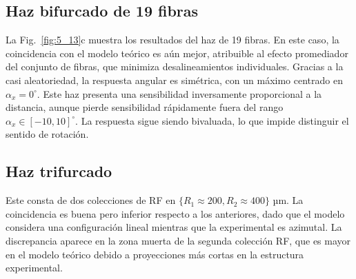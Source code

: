 \documentclass[11pt,a4paper]{article}
\begin{document}
\begin{multicols}{2}
\subsection{Haz bifurcado de 19 fibras}
La Fig.~\ref{fig:5_13}c muestra los resultados del haz de 19 fibras. En este caso, la coincidencia con el modelo teórico es aún mejor, atribuible al efecto promediador del conjunto de fibras, que minimiza desalineamientos individuales. Gracias a la casi aleatoriedad, la respuesta angular es simétrica, con un máximo centrado en $\alpha_x=0^\circ$. Este haz presenta una sensibilidad inversamente proporcional a la distancia, aunque pierde sensibilidad rápidamente fuera del rango $\alpha_x \in [-10,10]^\circ$. La respuesta sigue siendo bivaluada, lo que impide distinguir el sentido de rotación.
\unskip
\subsection{Haz trifurcado}
\unskip
Este consta de dos colecciones de RF en $\lbrace R_1 \approx 200,R_2 \approx 400\rbrace$ µm. La coincidencia es buena pero inferior respecto a los anteriores, dado que el modelo considera una configuración lineal mientras que la experimental es azimutal. La discrepancia aparece en la zona muerta de la segunda colección RF, que es mayor en el modelo teórico debido a proyecciones más cortas en la estructura experimental.
%
%

\end{multicols}
\end{document}
